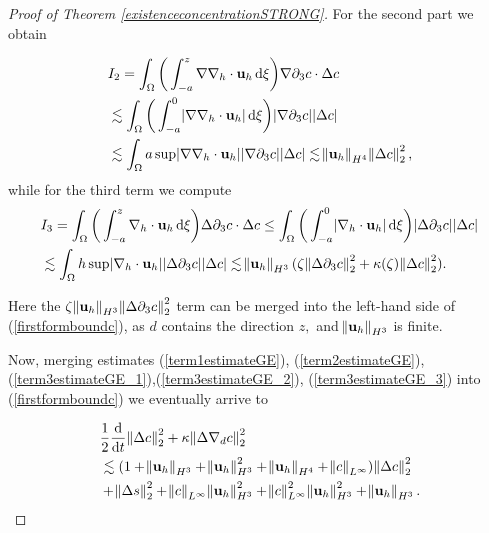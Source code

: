 \documentclass[11pt]{article}
\newcommand*\diff{\mathop{}\!\mathrm{d}}
\begin{document}
\begin{proof}[Proof of Theorem \ref{existenceconcentrationSTRONG}]
For the second part we obtain

\begin{equation} \label{term3estimateGE_2}
\begin{split}
& I_2 = \int_\Omega \bigg ( \int_{-a}^z \nabla \nabla_h \cdot \mathbf{u}_h \diff \xi \bigg) \nabla \partial_3 c \cdot \Delta c \\
& \lesssim \int_\Omega \bigg ( \int_{-a}^0 \abs{\nabla \nabla_h \cdot \mathbf{u}_h} \diff \xi \bigg) \abs{\nabla \partial_3 c} \abs{\Delta c} \\
& \lesssim \int_\Omega a \sup \abs{\nabla \nabla_h \cdot \mathbf{u}_h} \abs{\nabla \partial_3 c} \abs{\Delta c} \lesssim \norm{\mathbf{u}_h}_{H^4} \norm{\Delta c}_2^2,
\end{split}
\end{equation}
%
while for the third term we compute
%
\begin{equation} \label{term3estimateGE_3}
\begin{split}
& I_3 = \int_\Omega \bigg ( \int_{-a}^z \nabla_h \cdot \mathbf{u}_h \diff \xi \bigg) \Delta \partial_3 c \cdot \Delta c \leq \int_\Omega \bigg ( \int_{-a}^0 \abs{\nabla_h \cdot \mathbf{u}_h} \diff \xi \bigg) \abs{\Delta \partial_3 c} \abs{\Delta c}\\
& \lesssim \int_\Omega h \sup{\abs{\nabla_h \cdot \mathbf{u}_h}} \abs{\Delta \partial_3 c} \abs{\Delta c} \lesssim \norm{\mathbf{u}_h}_{H^3} (\zeta \norm{\Delta \partial_3 c}_2^2 + \kappa(\zeta)\norm{\Delta c}_2^2 ).
\end{split}
\end{equation}

Here the $\zeta \norm{\mathbf{u}_h}_{H^3} \norm{\Delta \partial_3 c}_2^2$ term can be merged into the left-hand side of (\ref{firstformboundc}), as $d$ contains the direction $z,$ and $\norm{\mathbf{u}_h}_{H^3}$ is finite.

Now, merging estimates (\ref{term1estimateGE}), (\ref{term2estimateGE}), (\ref{term3estimateGE_1}),(\ref{term3estimateGE_2}), (\ref{term3estimateGE_3}) into (\ref{firstformboundc}) we eventually arrive to

\begin{equation} \label{Gronwallstructureready}
\begin{split}
& \frac{1}{2} \frac{\diff}{\diff t} \norm{\Delta c}_2^2 + \kappa \norm{\Delta \nabla_d c}_2^2 \\
& \lesssim (1 + \norm{\mathbf{u}_h}_{H^3} + \norm{\mathbf{u}_h}_{H^3}^2 + \norm{\mathbf{u}_h}_{H^4} + \norm{c}_{L^\infty})\norm{\Delta c}_2^2 \\
& + \norm{\Delta s}_2^2 + \norm{c}_{L^\infty} \norm{\mathbf{u}_h}_{H^3}^2 + \norm{c}_{L^\infty}^2 \norm{\mathbf{u}_h}_{H^3}^2 + \norm{\mathbf{u}_h}_{H^3}.
\end{split}
\end{equation}


\end{proof}
\end{document}
